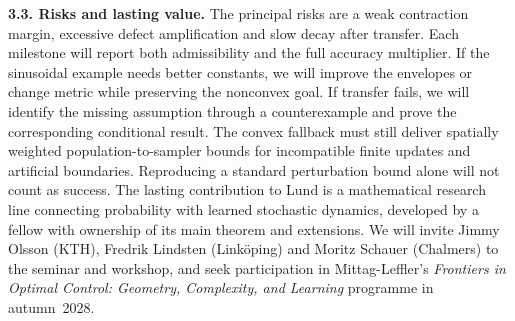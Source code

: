 \documentclass[12pt,a4paper]{article}
\begin{document}
\textbf{3.3. Risks and lasting value.}
The principal risks are a weak contraction margin, excessive defect amplification and slow decay after transfer. Each milestone will report both admissibility and the full accuracy multiplier. If the sinusoidal example needs better constants, we will improve the envelopes or change metric while preserving the nonconvex goal. If transfer fails, we will identify the missing assumption through a counterexample and prove the corresponding conditional result. The convex fallback must still deliver spatially weighted population-to-sampler bounds for incompatible finite updates and artificial boundaries. Reproducing a standard perturbation bound alone will not count as success.
The lasting contribution to Lund is a mathematical research line connecting probability with learned stochastic dynamics, developed by a fellow with ownership of its main theorem and extensions. We will invite Jimmy Olsson (KTH), Fredrik Lindsten (Link\"oping) and Moritz Schauer (Chalmers) to the seminar and workshop, and seek participation in Mittag-Leffler's \emph{Frontiers in Optimal Control: Geometry, Complexity, and Learning} programme in autumn~2028. 
\begingroup
\footnotesize
\end{document}
